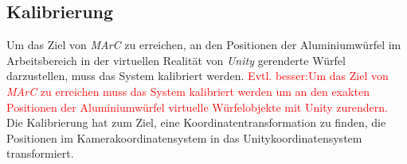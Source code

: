 \subsection{Kalibrierung}\label{sec:calib}
Um das Ziel von \textit{MArC} zu erreichen, an den Positionen der Aluminiumwürfel im Arbeitsbereich in der virtuellen Realität von \textit{Unity} gerenderte Würfel darzustellen, muss das System kalibriert werden. \textcolor{red}{Evtl. besser:Um das Ziel von \textit{MArC} zu erreichen muss das System kalibriert werden um an den exakten Positionen der Aluminiumwürfel virtuelle Würfelobjekte mit Unity zurendern. } Die Kalibrierung hat zum Ziel, eine Koordinatentransformation zu finden, die Positionen im Kamerakoordinatensystem in das Unitykoordinatensystem transformiert.

